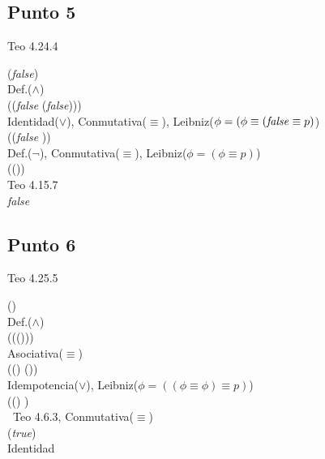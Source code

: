 \documentclass{article}
\begin{document}
\subsection{Punto 5}
\begin{logicenv}{Teo 4.24.4}
    \begin{derivation}
            (\phi \land \textrm{\textit{false}})\\
        Def.($\land$)\\
            (\phi \equiv (\textrm{\textit{false}} \equiv (\phi \lor \textrm{\textit{false}})))\\
        Identidad($\lor$), Conmutativa($\equiv$), Leibniz($\phi = (\phi \equiv (\textrm{\textit{false}} \equiv p)$)\\
            (\phi \equiv (\textrm{\textit{false}} \equiv \phi))\\
        Def.($\neg$), Conmutativa($\equiv$), Leibniz($\phi = (\phi \equiv p)$)\\
            (\phi \equiv (\neg \phi))\\
        Teo 4.15.7\\
            \textrm{\textit{false}}
    \end{derivation}
\end{logicenv}

\subsection{Punto 6}
\begin{logicenv}{Teo 4.25.5}
    \begin{derivation}
            (\phi \land \phi)\\
        Def.($\land$)\\
            (\phi \equiv (\phi \equiv (\phi \lor \phi)))\\
        Asociativa($\equiv$)\\
            ((\phi \equiv \phi) \equiv (\phi \lor \phi))\\
        Idempotencia($\lor$), Leibniz($\phi = ((\phi \equiv \phi) \equiv p)$)\\
            ((\phi \equiv \phi) \equiv \phi)\\\
        Teo 4.6.3, Conmutativa($\equiv$)\\
            (\phi \equiv \textrm{\textit{true}})\\
        Identidad\\
            \phi
    \end{derivation}
\end{logicenv}
\end{document}
